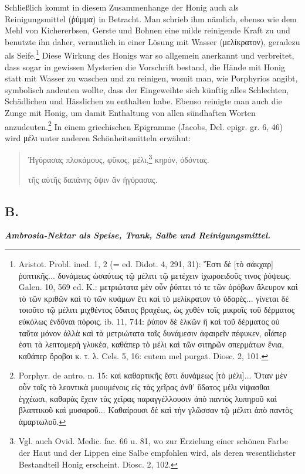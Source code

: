 \documentclass[a4paper, 11pt, oneside]{article}
\begin{document}
Schließlich kommt in diesem Zusammenhange der Honig auch als Reinigungsmittel (ῥύμμα) in Betracht. Man schrieb ihm nämlich, ebenso wie dem Mehl von Kichererbsen, Gerste und Bohnen eine milde reinigende Kraft zu und benutzte ihn daher, vermutlich in einer Lösung mit Wasser (μελίκρατον), geradezu als Seife.\footnote{Aristot. Probl. ined. 1, 2 (= ed. Didot. 4, 291, 31): Ἔστι δὲ [τὸ σάκχαρ] ῤυπτικῆς... δυνάμεως ὡσαύτως τῷ μέλιτι τῷ μετέχειν ἰχωροειδοῦς τινος ῤύψεως. Galen. 10, 569 ed. K.: μετριώτατα μὲν οὖν ῥύπτει τό τε τῶν ὀρόβων ἄλευρον καὶ τὸ τῶν κριθῶν καὶ τὸ τῶν κυάμων ἔτι καὶ τὸ μελίκρατον τὸ ὑδαρὲς... γίνεται δὲ τοιοῦτο τῷ μέλιτι μιχθέντος ὕδατος βραχέως, ὡς χυθὲν τοῖς μικροῖς τοῦ δἐρματος εὐκόλως ἐνδῦναι πόροις. ib. 11, 744: ῥύπον δὲ ἑλκῶν ἢ καὶ τοῦ δέρματος οὐ ταῦτα μόνον ἀλλὰ καὶ τὰ μετριώτατα ταῖς δυνάμεσιν ἀφαιρεῖν πέφυκεν, οἶάπερ ἐστι τὰ λεπτομερὴ γλυκέα, καθάπερ τὸ μέλι καὶ τῶν σιτηρῶν σπερμάτων ἕνια, καθάπερ ὅροβοι κ. τ. λ. Cels. 5, 16: cutem mel purgat. Diosc. 2, 101.} Diese Wirkung des Honigs war so allgemein anerkannt und verbreitet, dass sogar in gewissen Mysterien die Vorschrift bestand, die Hände mit Honig statt mit Wasser zu waschen und zu reinigen, womit man, wie Porphyrios angibt, symbolisch andeuten wollte, dass der Eingeweihte sich künftig alles Schlechten, Schädlichen und Hässlichen zu enthalten habe. Ebenso reinigte man auch die Zunge mit Honig, um damit Enthaltung von allen sündhaften Worten anzudeuten.\footnote{Porphyr. de antro. n. 15: καὶ καθαρτικῆς ἔστι δυνάμεως [τὸ μέλι]... Ὅταν μὲν οὖν τοῖς τὸ λεοντικὰ μυουμένοις εἰς τὰς χεῖρας ἀνθ' ὕδατος μέλι νίψασθαι ἐγχέωσι, καθαρὰς ἔχειν τὰς χεῖρας παραγγέλλουσιν ἀπὸ παντὸς λυπηροῦ καὶ βλαπτικοῦ καὶ μυσαροῦ... Καθαίρουσι δὲ καὶ τὴν γλῶσσαν τῷ μέλιτι ἀπὸ παντὸς ἁμαρτωλοῦ.} In einem griechischen Epigramme (Jacobs, Del. epigr. gr. 6, 46) wird μέλι unter anderen Schönheitsmitteln erwähnt:
\begin{quotation}
Ἠγόρασας πλοκάμους, φῦκος, μέλι,\footnote{Vgl. auch Ovid. Medic. fac. 66 u. 81, wo zur Erzielung einer schönen Farbe der Haut und der Lippen eine Salbe empfohlen wird, als deren wesentlichster Bestandteil Honig erscheint. Diosc. 2, 102.} κηρόν, ὀδόντας.

τῆς αὐτῆς δαπάνης ὄψιν ἂν ἠγόρασας.
\end{quotation}
\paragraph{}
\subsection{B.}
\begin{center}
\textbf{\emph{Ambrosia-Nektar als Speise, Trank, Salbe und Reinigungsmittel.}}
\end{center}
\end{document}

